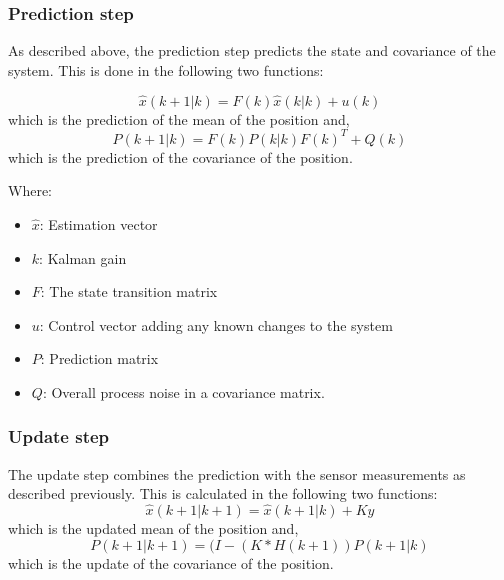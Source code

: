\subsubsection{Prediction step}
As described above, the prediction step predicts the state and covariance of the system. This is done in the following two functions:

\begin{equation}
\hat{x}(k+1|k) = F(k)\hat{x}(k|k)+u(k)
\end{equation}
which is the prediction of the mean of the position and,
\begin{equation}
P(k+1|k) = F(k)P(k|k)F(k)^T+Q(k)
\end{equation}
which is the prediction of the covariance of the position.

Where:
\begin{itemize}
    \item $\hat{x}$: Estimation vector
    \item $k$: Kalman gain
    \item $F$: The state transition matrix
    \item $u$: Control vector adding any known changes to the system 
    \item $P$: Prediction matrix
    \item $Q$: Overall process noise in a covariance matrix.
\end{itemize}
\vspace*{5mm}



\subsubsection{Update step}
The update step combines the prediction with the sensor measurements as described previously. This is calculated in the following two functions:
\begin{equation}
\hat{x}(k+1|k+1) = \hat{x}(k+1|k) + Ky
\label{eq:kalmanupdate1}
\end{equation}
which is the updated mean of the position and,
\begin{equation}
P(k+1|k+1) = (I - (K * H(k+1)) P(k+1|k)
\label{eq:kalmanupdate2}
\end{equation}
which is the update of the covariance of the position.

